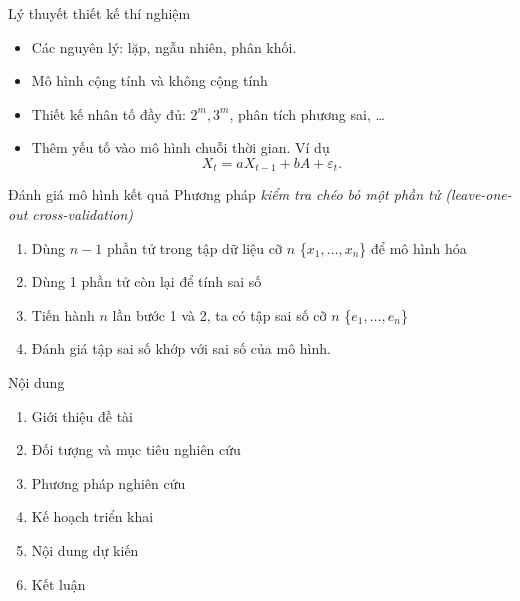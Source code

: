\documentclass{beamer}
\begin{document}
\begin{frame}{Lý thuyết thiết kế thí nghiệm}
\begin{itemize}
\item Các nguyên lý: lặp, ngẫu nhiên, phân khối.
\item Mô hình cộng tính và không cộng tính
\item Thiết kế nhân tố đầy đủ: \(2^m, 3^m\), phân tích phương sai, \ldots
\item Thêm yếu tố vào mô hình chuỗi thời gian. Ví dụ
\[X_t = a X_{t-1} + b A + \varepsilon_t.\]
\end{itemize}
\end{frame}

\begin{frame}{Đánh giá mô hình kết quả}
Phương pháp \textit{kiểm tra chéo bỏ một phần tử (leave-one-out cross-validation)}
\begin{enumerate}
\item Dùng \(n-1\) phần tử trong tập dữ liệu cỡ \(n\) \{\(x_1, \ldots, x_n\)\}
 để mô hình hóa
\item Dùng 1 phần tử còn lại để tính sai số
\item Tiến hành \(n\) lần bước 1 và 2, ta có tập sai số cỡ \(n\) \{\(e_1, \ldots, e_n\)\}
\item Đánh giá tập sai số khớp với sai số của mô hình.
\end{enumerate}
\end{frame}

\begin{frame}{Nội dung}
\begin{enumerate}
\item Giới thiệu đề tài
\item Đối tượng và mục tiêu nghiên cứu
\item Phương pháp nghiên cứu
\item {\color{red}Kế hoạch triển khai}
\item Nội dung dự kiến
\item Kết luận
\end{enumerate}
\end{frame}
\end{document}
